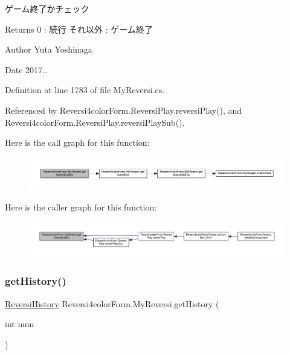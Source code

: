 ゲーム終了かチェック 

\begin{DoxyReturn}{Returns}
0 \+: 続行 それ以外 \+: ゲーム終了 
\end{DoxyReturn}
\begin{DoxyAuthor}{Author}
Yuta Yoshinaga 
\end{DoxyAuthor}
\begin{DoxyDate}{Date}
2017.. 
\end{DoxyDate}


Definition at line 1783 of file My\+Reversi.\+cs.



Referenced by Reversi4color\+Form.\+Reversi\+Play.\+reversi\+Play(), and Reversi4color\+Form.\+Reversi\+Play.\+reversi\+Play\+Sub().

Here is the call graph for this function\+:
\nopagebreak
\begin{figure}[H]
\begin{center}
\leavevmode
\includegraphics[width=350pt]{class_reversi4color_form_1_1_my_reversi_a5bdb21a8261d4af70bc2fabe7305ce22_cgraph}
\end{center}
\end{figure}
Here is the caller graph for this function\+:
\nopagebreak
\begin{figure}[H]
\begin{center}
\leavevmode
\includegraphics[width=350pt]{class_reversi4color_form_1_1_my_reversi_a5bdb21a8261d4af70bc2fabe7305ce22_icgraph}
\end{center}
\end{figure}
\mbox{\label{class_reversi4color_form_1_1_my_reversi_a6765e90e98f20c7a19a941400446d006}} 
\subsubsection{\texorpdfstring{get\+History()}{getHistory()}}
{\footnotesize\ttfamily \hyperlink{class_reversi4color_form_1_1_reversi_history}{Reversi\+History} Reversi4color\+Form.\+My\+Reversi.\+get\+History (\begin{DoxyParamCaption}\item[{int}]{num }\end{DoxyParamCaption})}



